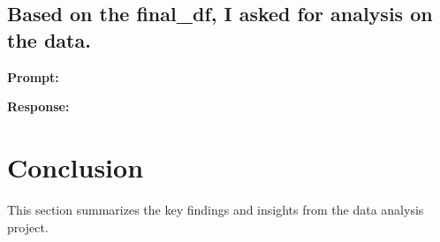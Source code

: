 \documentclass[11pt,a4paper]{article}
\begin{document}
\subsection{Based on the final\_df, I asked for analysis on the data.}
\textbf{Prompt:}
\begin{tcolorbox}
  
\end{tcolorbox}

\textbf{Response:}
\begin{tcolorbox}
    
  \end{tcolorbox}
  



\section{Conclusion}
\label{sec:conclusion}
This section summarizes the key findings and insights from the data analysis project.



\end{document}
